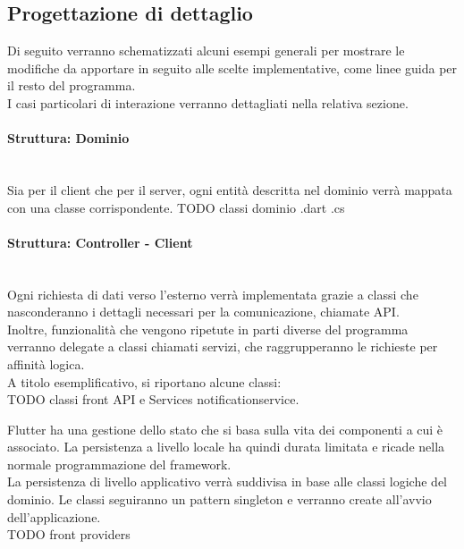 \newpage
\subsection{Progettazione di dettaglio}

Di seguito verranno schematizzati alcuni esempi generali per mostrare le modifiche da apportare in seguito alle scelte implementative, come linee guida per il resto del programma.\\
I casi particolari di interazione verranno dettagliati nella relativa sezione.

\paragraph{Struttura: Dominio}\mbox{}\\

Sia per il client che per il server, ogni entità descritta nel dominio verrà mappata con una classe corrispondente.
TODO classi dominio .dart .cs\\

\paragraph{Struttura: Controller - Client}\mbox{}\\
Ogni richiesta di dati verso l'esterno verrà implementata grazie a classi che nasconderanno i dettagli necessari per la comunicazione, chiamate API.\\
Inoltre, funzionalità che vengono ripetute in parti diverse del programma verranno delegate a classi chiamati servizi, che raggrupperanno le richieste per affinità logica.\\
A titolo esemplificativo, si riportano alcune classi:\\
TODO classi front API e Services
notificationservice.

Flutter ha una gestione dello stato che si basa sulla vita dei componenti a cui è associato. La persistenza a livello locale ha quindi durata limitata e ricade nella normale programmazione del framework.\\
La persistenza di livello applicativo verrà suddivisa in base alle classi logiche del dominio. Le classi seguiranno un pattern singleton e verranno create all'avvio dell'applicazione.\\
TODO front providers


